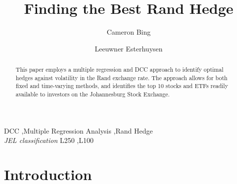 \documentclass[11pt,preprint, authoryear]{elsarticle}
\numberwithin{equation}{section}
\numberwithin{figure}{section}
\numberwithin{table}{section}
\begin{document}
\begin{frontmatter}  %

\title{Finding the Best Rand Hedge}

\author[Add1]{Cameron Bing}

\author[Add1,Add2]{Leeuwner Esterhuysen}




\address[Add1]{Stellenbosch University, Cape Town, South Africa}
\address[Add2]{Stellenbosch University, Cape Town, South Africa}


\begin{abstract}
\small{
This paper employs a multiple regression and DCC approach to identify
optimal hedges against volatility in the Rand exchange rate. The
approach allows for both fixed and time-varying methods, and identifies
the top 10 stocks and ETFs readily available to investors on the
Johannesburg Stock Exchange.
}
\end{abstract}

\vspace{1cm}

\begin{keyword}
\footnotesize{
DCC \sep Multiple Regression Analysis \sep Rand Hedge \\ \vspace{0.3cm}
\textit{JEL classification} L250 \sep L100
}
\end{keyword}
\vspace{0.5cm}
\end{frontmatter}



\pagestyle{fancy}
\chead{}
\rhead{}
\lfoot{}
\lhead{}
\cfoot{}


\headsep 35pt %




\section{\texorpdfstring{Introduction
\label{Introduction}}{Introduction }}\label{introduction}
\end{document}
